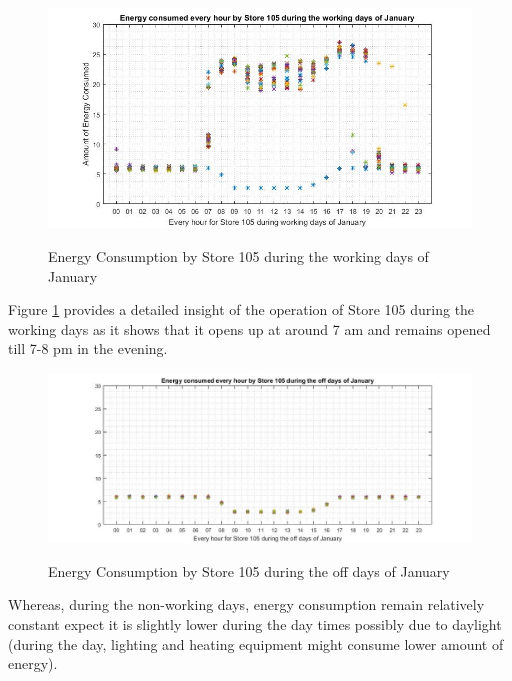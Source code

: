 \documentclass[12pt]{article}
\begin{document}
\begin{figure}[H]
	\centering
	{\includegraphics[scale=0.43]{new_105_jan_workdays.jpg}\label{103blockdiag}
	}
	\caption[The Block Diagram of the designed application]{Energy Consumption by Store 105 during the working days of January}
	\label{103blockdiag}
	\hspace{0cm}%
\end{figure}

Figure \ref{103blockdiag} provides a detailed insight of the operation of Store 105 during the working days as it shows that it opens up at around 7 am and remains opened till 7-8 pm in the evening. 

\begin{figure}[H]
	\centering
	{\includegraphics[scale=0.35]{new_105_jan_off_days1.jpg}\label{104blockdiag}
	}
	\caption[The Block Diagram of the designed application]{Energy Consumption by Store 105 during the off days of January}
	\label{104blockdiag}
	\hspace{0cm}%
\end{figure}

Whereas, during the non-working days, energy consumption remain relatively constant expect it is slightly lower during the day times possibly due to daylight (during the day, lighting and heating equipment might consume lower amount of energy).
\end{document}
